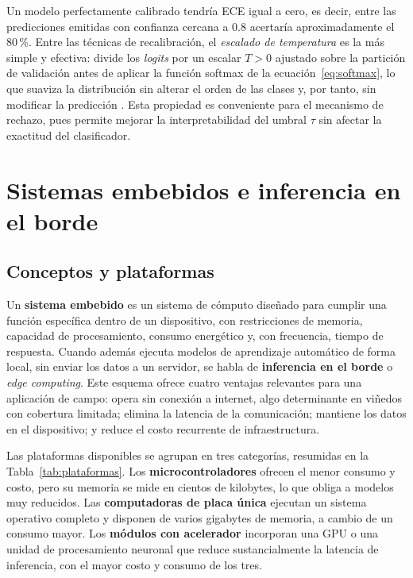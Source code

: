 Un modelo perfectamente calibrado tendría ECE igual a cero, es decir, entre
las predicciones emitidas con confianza cercana a 0.8 acertaría
aproximadamente el 80\,\%. Entre las técnicas de recalibración, el
\textit{escalado de temperatura} es la más simple y efectiva: divide los
\textit{logits} por un escalar $T > 0$ ajustado sobre la partición de
validación antes de aplicar la función softmax de la
ecuación~\ref{eq:softmax}, lo que suaviza la distribución sin alterar el
orden de las clases y, por tanto, sin modificar la predicción
\citep{guo2017}. Esta propiedad es conveniente para el mecanismo de
rechazo, pues permite mejorar la interpretabilidad del umbral $\tau$ sin
afectar la exactitud del clasificador.

\section{Sistemas embebidos e inferencia en el borde}

\subsection{Conceptos y plataformas}

Un \textbf{sistema embebido} es un sistema de cómputo diseñado para cumplir
una función específica dentro de un dispositivo, con restricciones de
memoria, capacidad de procesamiento, consumo energético y, con frecuencia,
tiempo de respuesta. Cuando además ejecuta modelos de aprendizaje
automático de forma local, sin enviar los datos a un servidor, se habla de
\textbf{inferencia en el borde} o \textit{edge computing}. Este esquema
ofrece cuatro ventajas relevantes para una aplicación de campo: opera sin
conexión a internet, algo determinante en viñedos con cobertura limitada;
elimina la latencia de la comunicación; mantiene los datos en el
dispositivo; y reduce el costo recurrente de infraestructura.

Las plataformas disponibles se agrupan en tres categorías, resumidas en la
Tabla~\ref{tab:plataformas}. Los \textbf{microcontroladores} ofrecen el
menor consumo y costo, pero su memoria se mide en cientos de kilobytes, lo
que obliga a modelos muy reducidos. Las \textbf{computadoras de placa
única} ejecutan un sistema operativo completo y disponen de varios
gigabytes de memoria, a cambio de un consumo mayor. Los \textbf{módulos con
acelerador} incorporan una GPU o una unidad de procesamiento neuronal que
reduce sustancialmente la latencia de inferencia, con el mayor costo y
consumo de los tres.

